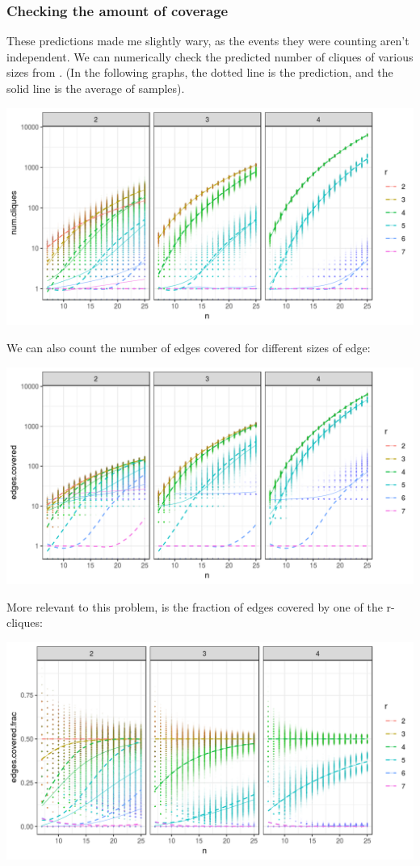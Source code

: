 \documentclass[12pt]{article}
\theoremstyle{definition}
\begin{document}
\subsubsection{Checking the amount of coverage}

These predictions made me slightly wary, as the events they were counting
aren't independent.
We can numerically check the predicted number of cliques
of various sizes from \cite{bollobas1976cliques}.
(In the following graphs, the dotted line is the prediction, and
the solid line is the average of samples).

\includegraphics[width=1\textwidth]{cliqueCounter/R/numCliques.png}

We can also count the number of edges covered for different sizes
of edge:

\includegraphics[width=1\textwidth]{cliqueCounter/R/edgesCovered.png}

More relevant to this problem, is the fraction of edges covered
by one of the r-cliques:

\includegraphics[width=1\textwidth]{cliqueCounter/R/fracCovered.png}
\end{document}
